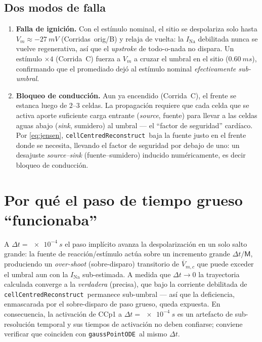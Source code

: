 \documentclass[11pt,a4paper]{article}
\newcommand{\Vm}{V_{m}}
\newcommand{\code}[1]{\texttt{\small #1}}
\newcommand{\gpode}{\code{gaussPointODE}}
\newcommand{\ccrec}{\code{cellCentredReconstruct}}
\newcommand{\Vbarc}{\overline{V}_{m,c}}
\begin{document}
\subsection{Dos modos de falla}

\begin{enumerate}[leftmargin=1.4em,nosep]
  \item \textbf{Falla de ignición.} Con el estímulo nominal, el sitio se despolariza
    solo hasta $\Vm\approx\SI{-27}{mV}$ (Corridas~orig/B) y relaja de vuelta: la
    $I_{\mathrm{Na}}$ debilitada nunca se vuelve regenerativa, así que el
    \emph{upstroke} de todo-o-nada no dispara. Un estímulo $\times 4$ (Corrida~C)
    fuerza a $\Vm$ a cruzar el umbral en el sitio ($\SI{0.60}{ms}$), confirmando
    que el promediado dejó al estímulo nominal \emph{efectivamente sub-umbral}.
  \item \textbf{Bloqueo de conducción.} Aun ya encendido (Corrida~C), el frente se
    estanca luego de $2$--$3$ celdas. La propagación requiere que cada celda que se
    activa aporte suficiente carga entrante (\emph{source}, fuente) para llevar a
    las celdas aguas abajo (\emph{sink}, sumidero) al umbral --- el ``factor de
    seguridad'' cardíaco. Por \eqref{eq:jensen}, \ccrec\ baja la fuente justo en el
    frente donde se necesita, llevando el factor de seguridad por debajo de uno: un
    desajuste \emph{source--sink} (fuente--sumidero) inducido numéricamente, es
    decir bloqueo de conducción.
\end{enumerate}

\section{Por qué el paso de tiempo grueso ``funcionaba''}

A $\Delta t=\SI{e-4}{s}$ el paso implícito avanza la despolarización en un solo
salto grande: la fuente de reacción/estímulo actúa sobre un incremento grande
$\Delta t/\mathsf{M}$, produciendo un \emph{over-shoot} (sobre-disparo) transitorio
de $\Vbarc$ que puede exceder el umbral aun con la $I_{\mathrm{Na}}$ sub-estimada.
A medida que $\Delta t\to0$ la trayectoria calculada converge a la \emph{verdadera}
(precisa), que bajo la corriente debilitada de \ccrec\ permanece sub-umbral --- así
que la deficiencia, enmascarada por el sobre-disparo de paso grueso, queda
expuesta. En consecuencia, la activación de CCp1 a $\Delta t=\SI{e-4}{s}$ es un
artefacto de sub-resolución temporal y sus tiempos de activación no deben confiarse;
conviene verificar que coinciden con \gpode\ al mismo $\Delta t$.
\end{document}

